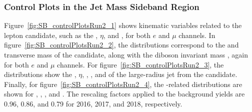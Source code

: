 \subsubsection{Control Plots in the Jet Mass Sideband Region}

Figure~\ref{fig:SB_controlPlotsRun2_1} shows kinematic variables related to the lepton candidate, such as the \pt, $\eta$, and \Etmiss, for both $e$ and $\mu$ channels.
In figure~\ref{fig:SB_controlPlotsRun2_2}, the distributions correspond to the \pt and transverse mass of the \Wlep candidate, along with the diboson invariant mass \MVV, again for both $e$ and $\mu$ channels.
For figure~\ref{fig:SB_controlPlotsRun2_3}, the distributions show the \pt, $\eta$, \MJ, \nsubjDDT, and \DoubleB of the large-radius jet from the \Vhad candidate.
Finally, for figure~\ref{fig:SB_controlPlotsRun2_4}, the \VBF-related distributions are shown for \DetaVBF, \mjjVBF, \nJets, and \Dy.
The rescaling factors applied to the \Wjets background yields are 0.96, 0.86, and 0.79 for 2016, 2017, and 2018, respectively.

